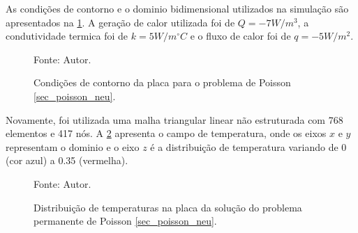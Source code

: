 As condições de contorno e o dominio bidimensional utilizados na simulação são apresentados na \ref{poisson_n_bc}.
A geração de calor utilizada foi de $Q = -7W/m^3$, a condutividade termica foi de $k=5 W/m^{\circ}C$ e o fluxo de calor foi de $q = -5 W/m^2$.
\begin{figure}[H]
    \centering
     {\raggedleft \scriptsize Fonte: Autor.}
    \caption{Condições de contorno da placa para o problema de Poisson \ref{sec_poisson_neu}.}
    \label{poisson_n_bc}
\end{figure}

Novamente, foi utilizada uma malha triangular linear não estruturada com 768 elementos e 417 nós.
A \ref{poisson_n_3d} apresenta o campo de temperatura, onde os eixos $x$ e $y$ representam o dominio e o eixo $z$ é a distribuição de temperatura variando de 0 (cor azul) a 0.35 (vermelha).
\begin{figure}[H]
    \centering
     {\raggedleft \scriptsize Fonte: Autor.}
    \caption{Distribuição de temperaturas na placa da solução do problema permanente de Poisson \ref{sec_poisson_neu}.}
    \label{poisson_n_3d}
\end{figure}

